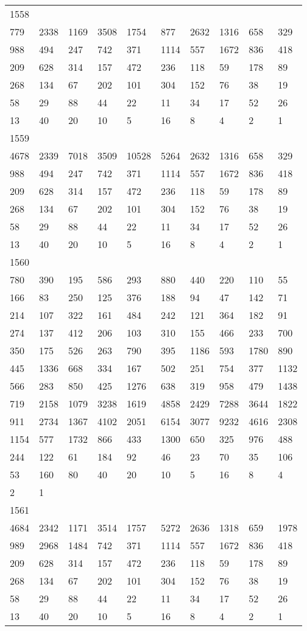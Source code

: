 \begin{longtable}{*{10}{l}}
1558&&&&&&&&&\\
779& 2338& 1169& 3508& 1754& 877& 2632& 1316& 658& 329\\
988& 494& 247& 742& 371& 1114& 557& 1672& 836& 418\\
209& 628& 314& 157& 472& 236& 118& 59& 178& 89\\
268& 134& 67& 202& 101& 304& 152& 76& 38& 19\\
58& 29& 88& 44& 22& 11& 34& 17& 52& 26\\
13& 40& 20& 10& 5& 16& 8& 4& 2& 1\\

1559&&&&&&&&&\\
4678& 2339& 7018& 3509& 10528& 5264& 2632& 1316& 658& 329\\
988& 494& 247& 742& 371& 1114& 557& 1672& 836& 418\\
209& 628& 314& 157& 472& 236& 118& 59& 178& 89\\
268& 134& 67& 202& 101& 304& 152& 76& 38& 19\\
58& 29& 88& 44& 22& 11& 34& 17& 52& 26\\
13& 40& 20& 10& 5& 16& 8& 4& 2& 1\\

1560&&&&&&&&&\\
780& 390& 195& 586& 293& 880& 440& 220& 110& 55\\
166& 83& 250& 125& 376& 188& 94& 47& 142& 71\\
214& 107& 322& 161& 484& 242& 121& 364& 182& 91\\
274& 137& 412& 206& 103& 310& 155& 466& 233& 700\\
350& 175& 526& 263& 790& 395& 1186& 593& 1780& 890\\
445& 1336& 668& 334& 167& 502& 251& 754& 377& 1132\\
566& 283& 850& 425& 1276& 638& 319& 958& 479& 1438\\
719& 2158& 1079& 3238& 1619& 4858& 2429& 7288& 3644& 1822\\
911& 2734& 1367& 4102& 2051& 6154& 3077& 9232& 4616& 2308\\
1154& 577& 1732& 866& 433& 1300& 650& 325& 976& 488\\
244& 122& 61& 184& 92& 46& 23& 70& 35& 106\\
53& 160& 80& 40& 20& 10& 5& 16& 8& 4\\
2& 1& \\

1561&&&&&&&&&\\
4684& 2342& 1171& 3514& 1757& 5272& 2636& 1318& 659& 1978\\
989& 2968& 1484& 742& 371& 1114& 557& 1672& 836& 418\\
209& 628& 314& 157& 472& 236& 118& 59& 178& 89\\
268& 134& 67& 202& 101& 304& 152& 76& 38& 19\\
58& 29& 88& 44& 22& 11& 34& 17& 52& 26\\
13& 40& 20& 10& 5& 16& 8& 4& 2& 1\\


\end{longtable}
